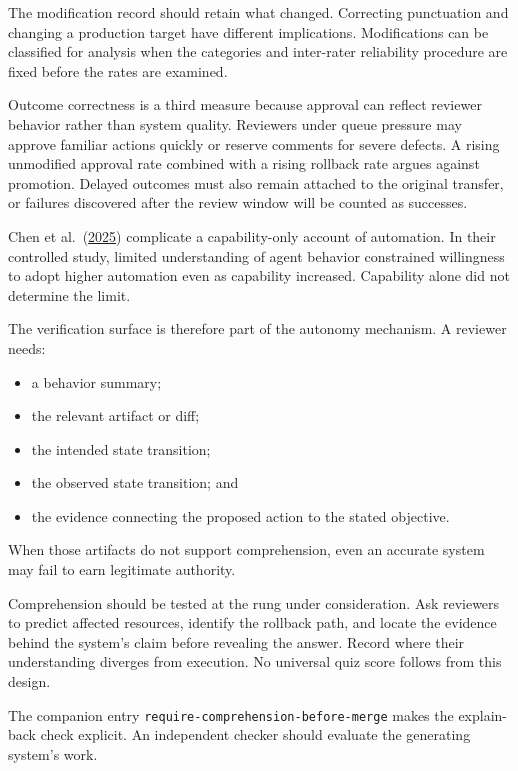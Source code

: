The modification record should retain what changed. Correcting punctuation and changing a production target have different implications. Modifications can be classified for analysis when the categories and inter-rater reliability procedure are fixed before the rates are examined.

Outcome correctness is a third measure because approval can reflect reviewer behavior rather than system quality. Reviewers under queue pressure may approve familiar actions quickly or reserve comments for severe defects. A rising unmodified approval rate combined with a rising rollback rate argues against promotion. Delayed outcomes must also remain attached to the original transfer, or failures discovered after the review window will be counted as successes.

Chen et al.~(\href{https://arxiv.org/abs/2507.08149}{2025}) complicate a capability-only account of automation. In their controlled study, limited understanding of agent behavior constrained willingness to adopt higher automation even as capability increased. Capability alone did not determine the limit.

The verification surface is therefore part of the autonomy mechanism. A reviewer needs:

\begin{itemize}
\tightlist
\item
  a behavior summary;
\item
  the relevant artifact or diff;
\item
  the intended state transition;
\item
  the observed state transition; and
\item
  the evidence connecting the proposed action to the stated objective.
\end{itemize}

When those artifacts do not support comprehension, even an accurate system may fail to earn legitimate authority.

Comprehension should be tested at the rung under consideration. Ask reviewers to predict affected resources, identify the rollback path, and locate the evidence behind the system's claim before revealing the answer. Record where their understanding diverges from execution. No universal quiz score follows from this design.

The companion entry \texttt{require-comprehension-before-merge} makes the explain-back check explicit. An independent checker should evaluate the generating system's work.

